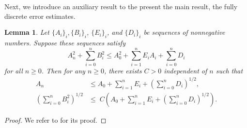 \documentclass[10pt,letterpaper]{amsart}
\theoremstyle{plain} %
\newtheorem{lemma}[theorem]{Lemma} %
\theoremstyle{remark} %
\begin{document}
Next, we introduce an auxiliary result to the present the main result, the fully discrete error estimates.
\begin{lemma}
\label{lemma:not-gronwall}
Let $\{A_i\}_i, \{B_i\}_i$, $\{E_i\}_i$, and $\{D_i\}_i$ be sequences of nonnegative numbers. Suppose these sequences satisfy
% 
\begin{equation*}
	A_n^2 + \sum_{i=0}^n B_i^2 \leq  A_0^2 + \sum_{i=1}^{n} E_i A_i + \sum_{i=0}^n D_i
\end{equation*}	
%	
for all $n \geq 0$. Then for any $n\geq 0$, there exists $C>0$ independent of $n$ such that
%
	\begin{align*}
		A_n
		&\leq  A_0 +  \sum_{i=1}^{n} E_i + \left({\sum_{i=0}^n D_i}\right)^{1/2} ,
		\\
		\left({\sum_{i=0}^n B_i^2}\right)^{1/2}
		&\leq \;C \left({A_0 +  \sum_{i=1}^{n} E_i + \left({\sum_{i=0}^n D_i }\right)^{1/2}}\right).
	\end{align*}	    
%  
\end{lemma}
\begin{proof}
We refer to \cite[Lemma~2]{Cesmelioglu:2023} for its proof.
\end{proof}
\end{document}
